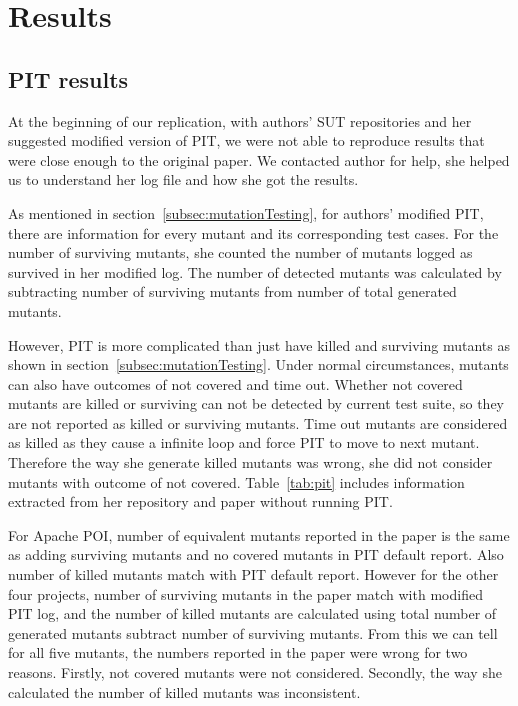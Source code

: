 \section{Results}
\subsection{PIT results}
\label{subsec:resultPIT}
At the beginning of our replication, with authors' SUT repositories and her suggested modified version of PIT, we were not able to reproduce results that were close enough to the original paper. We contacted author for help, she helped us to understand her log file and how she got the results.

As mentioned in section~\ref{subsec:mutationTesting}, for authors' modified PIT, there are information for every mutant and its corresponding test cases. For the number of surviving mutants, she counted the number of mutants logged as survived in her modified log. The number of detected mutants was calculated by subtracting number of surviving mutants from number of total generated mutants.

However, PIT is more complicated than just have killed and surviving mutants as shown in section~\ref{subsec:mutationTesting}. Under normal circumstances, mutants can also have outcomes of not covered and time out. Whether not covered mutants are killed or surviving can not be detected by current test suite, so they are not reported as killed or surviving mutants. Time out mutants are considered as killed as they cause a infinite loop and force PIT to move to next mutant. Therefore the way she generate killed mutants was wrong, she did not consider mutants with outcome of not covered. Table~\ref{tab:pit} includes information extracted from her repository and paper without running PIT. 

For Apache POI, number of equivalent mutants reported in the paper is the same as adding surviving mutants and no covered mutants in PIT default report. Also number of killed mutants match with PIT default report. However for the other four projects, number of surviving mutants in the paper match with modified PIT log, and the number of killed mutants are calculated using total number of generated mutants subtract number of surviving mutants. From this we can tell for all five mutants, the numbers reported in the paper were wrong for two reasons. Firstly, not covered mutants were not considered. Secondly, the way she calculated the number of killed mutants was inconsistent.

